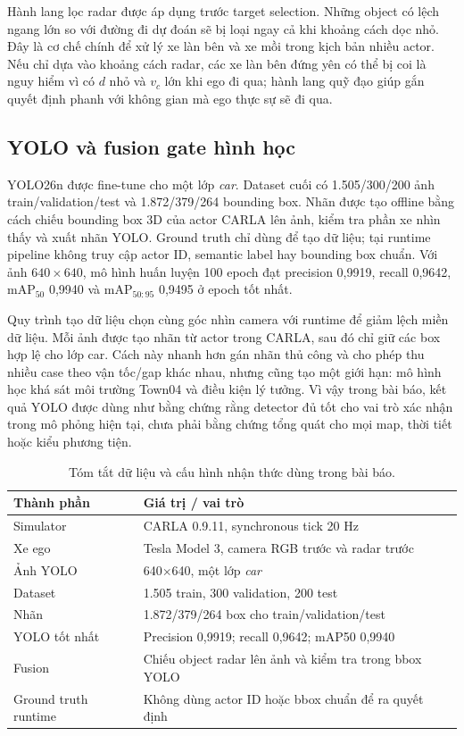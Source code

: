 \documentclass[conference]{IEEEtran}
\begin{document}
Hành lang lọc radar được áp dụng trước target selection. Những object có lệch ngang lớn so với đường đi dự đoán sẽ bị loại ngay cả khi khoảng cách dọc nhỏ. Đây là cơ chế chính để xử lý xe làn bên và xe mồi trong kịch bản nhiều actor. Nếu chỉ dựa vào khoảng cách radar, các xe làn bên đứng yên có thể bị coi là nguy hiểm vì có $d$ nhỏ và $v_c$ lớn khi ego đi qua; hành lang quỹ đạo giúp gắn quyết định phanh với không gian mà ego thực sự sẽ đi qua.

\subsection{YOLO và fusion gate hình học}
YOLO26n được fine-tune cho một lớp \textit{car}. Dataset cuối có 1.505/300/200 ảnh train/validation/test và 1.872/379/264 bounding box. Nhãn được tạo offline bằng cách chiếu bounding box 3D của actor CARLA lên ảnh, kiểm tra phần xe nhìn thấy và xuất nhãn YOLO. Ground truth chỉ dùng để tạo dữ liệu; tại runtime pipeline không truy cập actor ID, semantic label hay bounding box chuẩn. Với ảnh $640\times640$, mô hình huấn luyện 100 epoch đạt precision 0,9919, recall 0,9642, $\mathrm{mAP}_{50}$ 0,9940 và $\mathrm{mAP}_{50:95}$ 0,9495 ở epoch tốt nhất.

Quy trình tạo dữ liệu chọn cùng góc nhìn camera với runtime để giảm lệch miền dữ liệu. Mỗi ảnh được tạo nhãn từ actor trong CARLA, sau đó chỉ giữ các box hợp lệ cho lớp car. Cách này nhanh hơn gán nhãn thủ công và cho phép thu nhiều case theo vận tốc/gap khác nhau, nhưng cũng tạo một giới hạn: mô hình học khá sát môi trường Town04 và điều kiện lý tưởng. Vì vậy trong bài báo, kết quả YOLO được dùng như bằng chứng rằng detector đủ tốt cho vai trò xác nhận trong mô phỏng hiện tại, chưa phải bằng chứng tổng quát cho mọi map, thời tiết hoặc kiểu phương tiện.

\begin{table}[t]
\caption{Tóm tắt dữ liệu và cấu hình nhận thức dùng trong bài báo.}
\label{tab:perception}
\centering
\footnotesize
\begin{tabular}{p{}p{}}
\toprule
Thành phần & Giá trị / vai trò \\
\midrule
Simulator & CARLA 0.9.11, synchronous tick 20 Hz \\
Xe ego & Tesla Model 3, camera RGB trước và radar trước \\
Ảnh YOLO & 640$\times$640, một lớp \textit{car} \\
Dataset & 1.505 train, 300 validation, 200 test \\
Nhãn & 1.872/379/264 box cho train/validation/test \\
YOLO tốt nhất & Precision 0,9919; recall 0,9642; mAP50 0,9940 \\
Fusion & Chiếu object radar lên ảnh và kiểm tra trong bbox YOLO \\
Ground truth runtime & Không dùng actor ID hoặc bbox chuẩn để ra quyết định \\
\bottomrule
\end{tabular}
\end{table}
\end{document}
